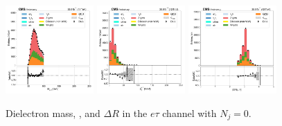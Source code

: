 \begin{figure}[htb!]
    \centering
    \includegraphics[width=0.3\textwidth]{chapters/Appendix/sectionPlots/figures/data_mc_overlays/etau_2016_cat_eq0_eq0_signal_linear_lepton_dilepton1_mass}
    \includegraphics[width=0.3\textwidth]{chapters/Appendix/sectionPlots/figures/data_mc_overlays/etau_2016_cat_eq0_eq0_signal_linear_lepton_dilepton1_pt}
    \includegraphics[width=0.3\textwidth]{chapters/Appendix/sectionPlots/figures/data_mc_overlays/etau_2016_cat_eq0_eq0_signal_linear_lepton_dilepton1_delta_r}
    \caption{Dielectron mass, \pt, and $\Delta R$ in the $e\tau$ channel
    with $N_{j} = 0$.}
    \label{fig:etau_1_dilepton}
\end{figure}

